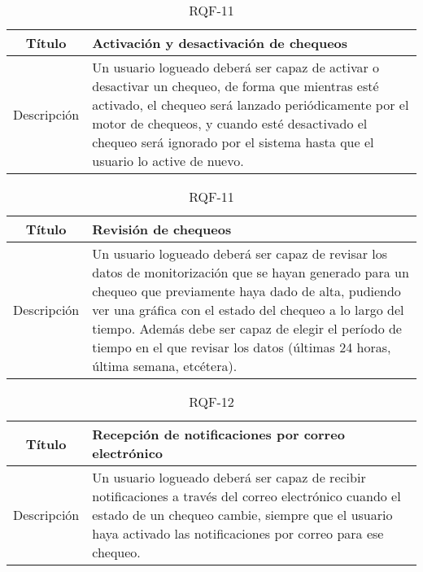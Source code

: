 \begin{table}[h!]
  \centering
  \begin{tabularx}{\textwidth}{|c|X|}
    \hline
    Título & Activación y desactivación de chequeos \\

    \hline

    Descripción & Un usuario logueado deberá ser capaz de activar o desactivar
    un chequeo, de forma que mientras esté activado, el chequeo será lanzado
    periódicamente por el motor de chequeos, y cuando esté desactivado el
    chequeo será ignorado por el sistema hasta que el usuario lo active de
    nuevo. \\

    \hline
  \end{tabularx}
  \caption{RQF-11}
\end{table}

\begin{table}[h!]
  \centering
  \begin{tabularx}{\textwidth}{|c|X|}
    \hline
    Título & Revisión de chequeos \\

    \hline

    Descripción & Un usuario logueado deberá ser capaz de revisar los datos de
    monitorización que se hayan generado para un chequeo que previamente haya
    dado de alta, pudiendo ver una gráfica con el estado del chequeo a lo largo
    del tiempo. Además debe ser capaz de elegir el período de tiempo en el que
    revisar los datos (últimas 24 horas, última semana, etcétera). \\

    \hline
  \end{tabularx}
  \caption{RQF-11}
\end{table}


\begin{table}[h!]
  \centering
  \begin{tabularx}{\textwidth}{|c|X|}
    \hline
    Título & Recepción de notificaciones por correo electrónico \\

    \hline

    Descripción & Un usuario logueado deberá ser capaz de recibir notificaciones
    a través del correo electrónico cuando el estado de un chequeo cambie,
    siempre que el usuario haya activado las notificaciones por correo para ese
    chequeo. \\

    \hline
  \end{tabularx}
  \caption{RQF-12}
\end{table}

